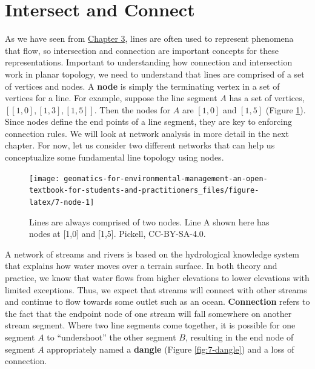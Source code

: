 \documentclass[
]{book}
\begin{document}
\section{Intersect and Connect}\label{intersect-and-connect}

As we have seen from \href{https://ubc-geomatics-textbook.github.io/geomatics-textbook/types-of-data.html}{Chapter 3}, lines are often used to represent phenomena that flow, so intersection and connection are important concepts for these representations. Important to understanding how connection and intersection work in planar topology, we need to understand that lines are comprised of a set of vertices and nodes. A \textbf{node} is simply the terminating vertex in a set of vertices for a line. For example, suppose the line segment \(A\) has a set of vertices, \([[1,0],[1,3],[1,5]]\). Then the nodes for \(A\) are \([1,0]\) and \([1,5]\) (Figure \ref{fig:7-node}). Since nodes define the end points of a line segment, they are key to enforcing connection rules. We will look at network analysis in more detail in the next chapter. For now, let us consider two different networks that can help us conceptualize some fundamental line topology using nodes.

\begin{figure}

{\centering \texttt{[image: geomatics-for-environmental-management-an-open-textbook-for-students-and-practitioners\_files/figure-latex/7-node-1]} 

}

\caption{Lines are always comprised of two nodes. Line A shown here has nodes at [1,0] and [1,5]. Pickell, CC-BY-SA-4.0.}\label{fig:7-node}
\end{figure}

A network of streams and rivers is based on the hydrological knowledge system that explains how water moves over a terrain surface. In both theory and practice, we know that water flows from higher elevations to lower elevations with limited exceptions. Thus, we expect that streams will connect with other streams and continue to flow towards some outlet such as an ocean. \textbf{Connection} refers to the fact that the endpoint node of one stream will fall somewhere on another stream segment. Where two line segments come together, it is possible for one segment \(A\) to ``undershoot'' the other segment \(B\), resulting in the end node of segment \(A\) appropriately named a \textbf{dangle} (Figure \ref{fig:7-dangle}) and a loss of connection.
\end{document}
